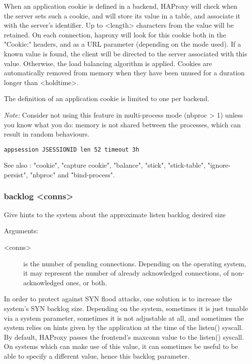   When an application cookie is defined in a backend, HAProxy will check when
  the server sets such a cookie, and will store its value in a table, and
  associate it with the server's identifier. Up to <length> characters from
  the value will be retained. On each connection, haproxy will look for this
  cookie both in the "Cookie:" headers, and as a URL parameter (depending on
  the mode used). If a known value is found, the client will be directed to the
  server associated with this value. Otherwise, the load balancing algorithm is
  applied. Cookies are automatically removed from memory when they have been
  unused for a duration longer than <holdtime>.

  The definition of an application cookie is limited to one per backend.

  \emph{Note:}
         Consider not using this feature in multi-process mode (nbproc > 1)
         unless you know what you do: memory is not shared between the
         processes, which can result in random behaviours.
         
  \verb|appsession JSESSIONID len 52 timeout 3h|

  See also : "cookie", "capture cookie", "balance", "stick", "stick-table",
             "ignore-persist", "nbproc" and "bind-process".
\subsubsection[backlog]{
backlog <conns>
}
  Give hints to the system about the approximate listen backlog desired size
 
  
  Arguments:
  \begin{description}
  \item[<conns>]
         is the number of pending connections. Depending on the operating
              system, it may represent the number of already acknowledged
              connections, of non-acknowledged ones, or both.
  \end{description}

  In order to protect against SYN flood attacks, one solution is to increase
  the system's SYN backlog size. Depending on the system, sometimes it is just
  tunable via a system parameter, sometimes it is not adjustable at all, and
  sometimes the system relies on hints given by the application at the time of
  the listen() syscall. By default, HAProxy passes the frontend's maxconn value
  to the listen() syscall. On systems which can make use of this value, it can
  sometimes be useful to be able to specify a different value, hence this
  backlog parameter.

